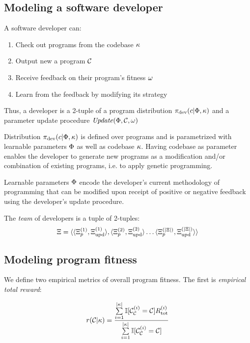 \subsection{Modeling a software developer}
\label{sec:developer}

A software developer can:
\begin{enumerate}
    \item Check out programs from the codebase $\kappa$
    \item Output new a program $\mathcal{C}$
    \item Receive feedback on their program's fitness $\omega$ 
    \item Learn from the feedback by modifying its strategy
\end{enumerate}

Thus, a developer is a 2-tuple of a program distribution $\pi_\text{dev}(c | \Phi, \kappa)$ and a parameter update procedure $\mathit{Update}(\Phi, \mathcal{C}, \omega)$

Distribution $\pi_{\text{dev}}(c | \Phi, \kappa)$ is defined over programs and is parametrized with learnable parameters $\Phi$ as well as codebase $\kappa$. 
Having codebase as parameter enables the developer to generate new programs as a modification and/or combination of existing programs, i.e. to apply genetic programming.

Learnable parameters $\Phi$ encode the developer's current methodology of programming that can be modified upon receipt of positive or negative feedback using the developer's update procedure. 

The \emph{team} of developers is a tuple of 2-tuples:
\begin{equation}
    \Xi = \langle \langle \Xi_p^{(1)}, \Xi_\text{upd}^{(1)} \rangle, \langle \Xi_p^{(2)}, \Xi_\text{upd}^{(2)} \rangle \dots \langle \Xi_p^{(|\Xi|)}, \Xi_\text{upd}^{(|\Xi|)} \rangle \rangle
\end{equation}

\newpage \subsection{Modeling program fitness}
\label{sec:fitness}

We define two empirical metrics of overall program fitness.
The first is \emph{empirical total reward}:

\begin{equation}
    r(\mathcal{C}|\kappa) = \frac{\sum\limits_{i=1}^{|\kappa|} \mathbb{I}[\mathcal{C}_{\mathcal{C}}^{(i)}=\mathcal{C}] R_\text{tot}^{(i)}}{\sum\limits_{i=1}^{|\kappa|} \mathbb{I}[\mathcal{C}_{\mathcal{C}}^{(i)}=\mathcal{C}]}
\end{equation}

